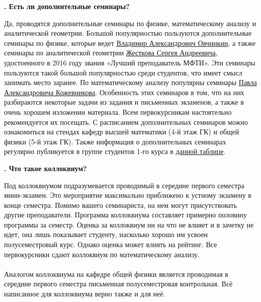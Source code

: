 \documentclass[14pt]{extarticle}
\newcounter{question}
\newcommand\Que[1]{%
    \begin{minipage}{\textwidth}
    \leavevmode\par
    \stepcounter{question}
    \noindent
    {\large\textbf{\thequestion. #1}}\par}
\newcommand\Ans[2][]{%
    \leavevmode\par\noindent
    {\leftskip37pt
    \textbf{#1}#2\par}
    \end{minipage}}
\begin{document}
\Que{Есть ли дополнительные семинары?}
\Ans{Да, проводятся дополнительные семинары по физике, математическому анализу и аналитической геометрии. Большой популярностью пользуются дополнительные семинары по физике, которые ведет \href{http://wikimipt.org/wiki/\%D0\%9E\%D0\%B2\%D1\%87\%D0\%B8\%D0\%BD\%D0\%BA\%D0\%B8\%D0\%BD_\%D0\%92\%D0\%BB\%D0\%B0\%D0\%B4\%D0\%B8\%D0\%BC\%D0\%B8\%D1\%80_\%D0\%90\%D0\%BB\%D0\%B5\%D0\%BA\%D1\%81\%D0\%B0\%D0\%BD\%D0\%B4\%D1\%80\%D0\%BE\%D0\%B2\%D0\%B8\%D1\%87}{Владимир Александрович Овчинкин}, а также семинары по аналитической геометрии \href{http://wikimipt.org/wiki/\%D0\%96\%D0\%B5\%D1\%81\%D1\%82\%D0\%BA\%D0\%BE\%D0\%B2_\%D0\%A1\%D0\%B5\%D1\%80\%D0\%B3\%D0\%B5\%D0\%B9_\%D0\%90\%D0\%BD\%D0\%B4\%D1\%80\%D0\%B5\%D0\%B5\%D0\%B2\%D0\%B8\%D1\%87}{Жесткова Сергея Андреевича}, удостоенного в 2016 году звания «Лучший преподаватель МФТИ». Эти семинары пользуются такой большой популярностью среди студентов, что имеет смысл занимать место заранее. По математическому анализу популярны семинары \href{http://wikimipt.org/wiki/\%D0\%9A\%D0\%BE\%D0\%B6\%D0\%B5\%D0\%B2\%D0\%BD\%D0\%B8\%D0\%BA\%D0\%BE\%D0\%B2_\%D0\%9F\%D0\%B0\%D0\%B2\%D0\%B5\%D0\%BB_\%D0\%90\%D0\%BB\%D0\%B5\%D0\%BA\%D1\%81\%D0\%B0\%D0\%BD\%D0\%B4\%D1\%80\%D0\%BE\%D0\%B2\%D0\%B8\%D1\%87}{Павла Александровича Кожевникова}. Особенность этих семинаров в том, что на них разбираются некоторые задачи из задания и письменных экзаменов, а также в очень хорошем изложении материала. Всем первокурсникам настоятельно рекомендуется их посещать. С расписанием дополнительных семинаров можно ознакомиться на стендах кафедр высшей математики (4-й этаж ГК) и общей физики (5-й этаж ГК). Также информация о дополнительных семинарах регулярно публикуется в группе студентов 1-го курса в \href{https://docs.google.com/spreadsheets/d/1M6Rw4YA6vlkbj5zYJtBc4Z5bTZ47kVKb2b7ZFDoi3X8/edit#gid=0}{данной таблице}.}

\Que{Что такое коллоквиум?}
\Ans{Под коллоквиумом подразумевается проводимый в середине первого семестра мини-экзамен. Это мероприятие максимально приближено к устному экзамену в конце семестра. Помимо вашего семинариста, на нем могут присутствовать другие преподаватели. Программа коллоквиума составляет примерно половину программы за семестр. Оценка за коллоквиум ни на что не влияет и в зачетку не идет, она лишь показывает студенту, насколько хорошо им усвоен полусеместровый курс. Однако оценка может влиять на рейтинг. Все первокурсники сдают коллоквиум по математическому анализу. \\ \\ Аналогом коллоквиума на кафедре общей физики является проводимая в середине первого семестра письменная полусеместровая контрольная. Всё написанное для коллоквиума верно также и для неё.}
\end{document}
